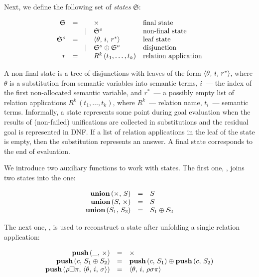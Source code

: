Next, we define the following set of \emph{states} $\mathfrak{S}$:

\[
\begin{array}{rccll}
  \mathfrak{S} & = &      & \times         & \mbox{final state}\\
               &   & \mid & \mathfrak{S}^o & \mbox{non-final state}\\

  \mathfrak{S}^o & = &     & \langle \theta,\,i,\,r^* \rangle            & \mbox{leaf state}\\
                 &   &\mid & \mathfrak{S}^o\oplus\mathfrak{S}^o & \mbox{disjunction}\\
  
  r              & = &     & R^k\,(t_1,\dots,t_k)               & \mbox{relation application}
\end{array}
\]

A non-final state is a tree of disjunctions with leaves of the form $\langle \theta,\,i,\,r^* \rangle$, where $\theta$ is a substitution from semantic variables into semantic terms,
$i$~--- the index of the first non-allocated semantic variable, and $r^*$~--- a possibly empty list of relation applications $R^k\,(t_1,\dots,t_k)$, where $R^k$~--- relation name,
$t_i$~--- semantic terms. Informally, a state represents some point during goal evaluation when the results of (non-failed) unifications are collected in substitutions and the residual
goal is represented in DNF. If a list of relation applications in the leaf of the state is empty, then the substitution represents an answer. A final state corresponds to the end of evaluation.

We introduce two auxiliary functions to work with states. The first one, , joins two states into the one:

\[
\begin{array}{rcl}
  \mbox{\bf union}\,(\times,\, S) & = & S \\
  \mbox{\bf union}\,(S,\, \times) & = & S \\
  \mbox{\bf union}\,(S_1,\, S_2) & = & S_1\oplus S_2
\end{array}
\]

The next one, , is used to reconstruct a state after unfolding a single relation application:

\[
\begin{array}{rcl}
  \mbox{\bf push}\,(\_,\,\times) & = & \times\\
  \mbox{\bf push}\,(c,\,S_1\oplus S_2) & = & \mbox{\bf push}\,(c,\,S_1)\oplus\mbox{\bf push}\,(c,\,S_2)\\
  \mbox{\bf push}\,(\rho\Box\pi,\,\langle \theta,\,i,\,\sigma \rangle) & = & \langle \theta,\,i,\,\rho\sigma\pi \rangle
\end{array}
\]

